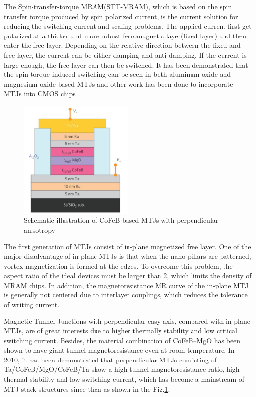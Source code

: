 The Spin-transfer-torque MRAM(STT-MRAM), which is based on the spin transfer torque produced by spin polarized current, is the current solution for reducing the switching current and scaling problems. The applied current first get polarized at a thicker and more robust ferromagnetic layer(fixed layer) and then enter the free layer. Depending on the relative direction between the fixed and free layer, the current can be either damping and anti-damping. If the current is large enough, the free layer can then be switched. It has been demonstrated that the spin-torque induced switching can be seen in both aluminum oxide and magnesium oxide based MTJs\cite{STTSwitchingMTJ1}\cite{STTSwitchingMTJ2} and other work has been done to incorporate MTJs into CMOS chips\cite{MTJIBM} \cite{MTJIBM2}\cite{MRAMMTJs}.


\begin{figure}[h!]
\centering
\includegraphics[width=0.5\textwidth]{fig/MTJ/MTJStack}
\caption{ Schematic illustration of CoFeB-based MTJs with perpendicular anisotropy}
\label{fig:MTJStack}
\end{figure}



The first generation of MTJs consist of in-plane magnetized free layer. One of the major disadvantage of in-plane MTJs is that when the nano pillars are patterned, vortex magnetization is formed at the edges\cite{vortex1}\cite{vortex2}. To overcome this problem, the aspect ratio of the ideal devices must be larger than 2\cite{vortex3}, which limits the density of MRAM chips. In addition, the magnetoresistance  MR  curve of the in-plane MTJ is generally not centered due to interlayer couplings\cite{inplaneswitching}, which reduces the tolerance of writing current.


Magnetic Tunnel Junctions with perpendicular easy axis, compared with in-plane MTJs, are of great interests due to higher thermally stability and low critical switching current\cite{PMA1}\cite{PMA3}\cite{PMA2}. Besides, the material combination of CoFeB–MgO has been shown to have giant tunnel magnetoresistance even at room temperature\cite{GiantTMR}\cite{GiantTMR2}\cite{GiantTMR3}. In 2010, it has been demonstrated that perpendicular MTJs consisting of Ta/CoFeB/MgO/CoFeB/Ta show a high tunnel magnetoresistance ratio, high thermal stability and low switching current\cite{MTJPMA}, which has become a mainstream of MTJ stack structures since then as shown in the Fig.\ref{fig:MTJStack}.

